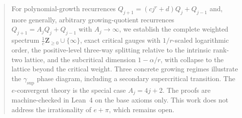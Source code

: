 
\maketitle

\begin{abstract}
For polynomial-growth recurrences $Q_{j+1}=(cj^r+d)Q_j+Q_{j-1}$ and, more
generally, arbitrary growing-quotient recurrences $Q_{j+1}=A_jQ_j+Q_{j-1}$
with $A_j\to\infty$, we establish the complete weighted spectrum
$\frac1c\mathbf{Z}_{\ge0}\cup\{\infty\}$, exact critical gauges with
$1/r$-scaled logarithmic order, the positive-level three-way splitting
relative to the intrinsic rank-two lattice, and the subcritical dimension
$1-\alpha/r$, with collapse to the lattice beyond the critical weight.
Three concrete growing regimes illustrate the $\gamma_{\sup}$ phase diagram,
including a secondary supercritical transition. The $e$-convergent theory is
the special case $A_j=4j+2$. The proofs are machine-checked in Lean~4 on the
base axioms only. This work does not address the irrationality of $e+\pi$,
which remains open.
\end{abstract}

